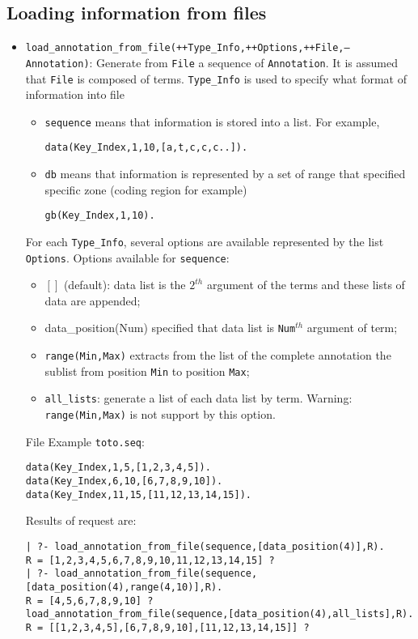 \documentclass{book}
\begin{document}
{\subsection{Loading information from files}

\begin{itemize}
\item \texttt{load\_annotation\_from\_file(++Type\_Info,++Options,++File,--Annotation)}:
Generate from \texttt{File} a sequence of \texttt{Annotation}. It is assumed that \texttt{File} is composed
of terms. \texttt{Type\_Info} is used to specify what format of information into file
\begin{itemize}
\item \texttt{sequence} means that information is stored into a list. For example, 
\begin{verbatim}
data(Key_Index,1,10,[a,t,c,c,c..]).
\end{verbatim}
\item \texttt{db} means that information is represented by a set of range that specified specific zone (coding region for example)
\begin{verbatim}
gb(Key_Index,1,10).
\end{verbatim}
\end{itemize}
For each \texttt{Type\_Info}, several options are available represented by the list \texttt{Options}. Options available
for \texttt{sequence}:
\begin{itemize}
\item $[]$ (default): data list is the $2^{th}$ argument of the terms and these lists of data are appended;
\item data\_position(Num) specified that data list is \texttt{Num}$^{th}$ argument of term;
\item \texttt{range(Min,Max)} extracts from the list of the complete annotation the sublist from position \texttt{Min} to
position \texttt{Max};
\item \texttt{all\_lists}: generate a list of each data list by term. Warning: \texttt{range(Min,Max)} is not support by this option.
\end{itemize}
File Example \texttt{toto.seq}:
\begin{verbatim}
data(Key_Index,1,5,[1,2,3,4,5]).
data(Key_Index,6,10,[6,7,8,9,10]).
data(Key_Index,11,15,[11,12,13,14,15]).
\end{verbatim}
Results of request are:
\begin{verbatim}
| ?- load_annotation_from_file(sequence,[data_position(4)],R).
R = [1,2,3,4,5,6,7,8,9,10,11,12,13,14,15] ?
| ?- load_annotation_from_file(sequence,[data_position(4),range(4,10)],R).
R = [4,5,6,7,8,9,10] ?
load_annotation_from_file(sequence,[data_position(4),all_lists],R).
R = [[1,2,3,4,5],[6,7,8,9,10],[11,12,13,14,15]] ?
\end{verbatim}


\end{itemize}}
\end{document}
